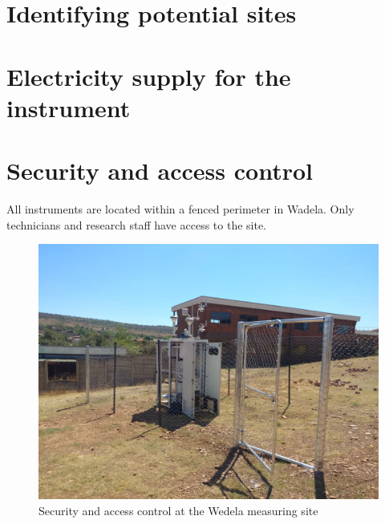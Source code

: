 \documentclass{nwureport}
\begin{document}
\section{Identifying potential sites}

\section{Electricity supply for the instrument}

\section{Security and access control}
All instruments are located within a fenced perimeter in Wadela. Only technicians and
research staff have access to the site.

\begin{figure}[!htb]
    \centering
    \includegraphics[width=\textwidth]{images/wedela_4.jpeg}
    \caption[Security and access control at the Wedela measuring site]{Security and access control at the Wedela measuring site}
    \label{fig:wadela_fence}
\end{figure}
\end{document}
